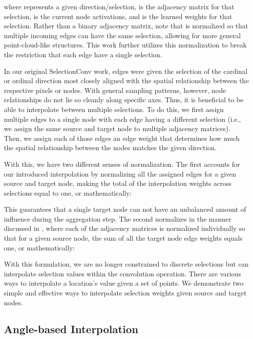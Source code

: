 \documentclass[10pt,twocolumn,letterpaper]{article}
\begin{document}
\noindent where  represents a given direction/selection, 
 is the adjacency matrix for that selection,  is the current node activations, and  is the learned weights for that selection. Rather than a binary adjacency matrix, note that  is normalized so that multiple incoming edges can have the same selection, allowing for more general point-cloud-like structures.  This work further utilizes this normalization to break the restriction that each edge have a single selection.

In
our
original SelectionConv work, edges were given the selection of the cardinal or ordinal direction most closely aligned with the spatial relationship between the respective pixels or nodes. With general sampling patterns, however, node relationships do not lie so cleanly along specific axes. Thus, it is beneficial to be able to interpolate between multiple selections. To do this, we first assign multiple edges to a single node with each edge having a different selection (i.e., we assign the same source and target node to multiple adjacency matrices). Then, we assign each of those edges an edge weight that determines how much the spatial relationship between the nodes matches the given direction.

With this, we have two different senses of normalization. The first accounts for our introduced interpolation by normalizing all the assigned edges for a given source and target node, making the total of the interpolation weights across selections equal to one, or mathematically:

\noindent This guarantees that a single target node can not have an unbalanced amount of influence during the aggregation step. The second normalizes in the manner discussed in \cite{SelectionConv}, where each of the adjacency matrices is normalized individually so that for a given source node, the sum of all the target node edge weights equals one, or mathematically:


With this formulation, we are no longer constrained to discrete selections but can interpolate selection values within the convolution operation. There are various ways to interpolate a location's value given a set of points. We demonstrate two simple and effective ways to interpolate selection weights given source and target nodes.


\subsection{Angle-based Interpolation}\label{sec:Angle}
\end{document}
